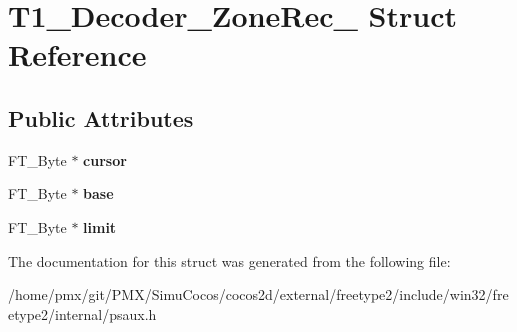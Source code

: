 \hypertarget{structT1__Decoder__ZoneRec__}{}\section{T1\+\_\+\+Decoder\+\_\+\+Zone\+Rec\+\_\+ Struct Reference}
\label{structT1__Decoder__ZoneRec__}
\subsection*{Public Attributes}
\begin{DoxyCompactItemize}
\item 
\mbox{\label{structT1__Decoder__ZoneRec___a1ad512d26fb55a2296a7427d43a3d864}} 
F\+T\+\_\+\+Byte $\ast$ {\bfseries cursor}
\item 
\mbox{\label{structT1__Decoder__ZoneRec___a4b7b55df267f16cb55c746b688d07836}} 
F\+T\+\_\+\+Byte $\ast$ {\bfseries base}
\item 
\mbox{\label{structT1__Decoder__ZoneRec___a616a4182dbf1048f836936c742011ddc}} 
F\+T\+\_\+\+Byte $\ast$ {\bfseries limit}
\end{DoxyCompactItemize}


The documentation for this struct was generated from the following file\+:\begin{DoxyCompactItemize}
\item 
/home/pmx/git/\+P\+M\+X/\+Simu\+Cocos/cocos2d/external/freetype2/include/win32/freetype2/internal/psaux.\+h\end{DoxyCompactItemize}
